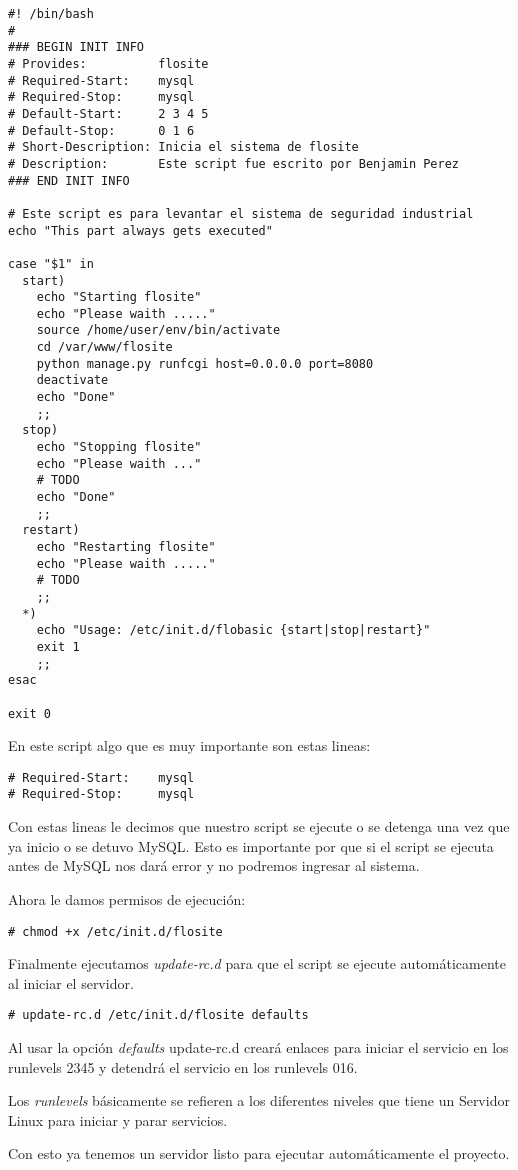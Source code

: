 \begin{verbatim}
#! /bin/bash
#
### BEGIN INIT INFO
# Provides:          flosite
# Required-Start:    mysql
# Required-Stop:     mysql
# Default-Start:     2 3 4 5
# Default-Stop:      0 1 6
# Short-Description: Inicia el sistema de flosite
# Description:       Este script fue escrito por Benjamin Perez
### END INIT INFO

# Este script es para levantar el sistema de seguridad industrial
echo "This part always gets executed"

case "$1" in
  start)
    echo "Starting flosite"
    echo "Please waith ....."
    source /home/user/env/bin/activate
    cd /var/www/flosite
    python manage.py runfcgi host=0.0.0.0 port=8080
    deactivate
    echo "Done" 
    ;;
  stop)
    echo "Stopping flosite"
    echo "Please waith ..."
    # TODO
    echo "Done"
    ;;
  restart)
    echo "Restarting flosite"
    echo "Please waith ....."
    # TODO
    ;;
  *)
    echo "Usage: /etc/init.d/flobasic {start|stop|restart}"
    exit 1
    ;;
esac

exit 0

\end{verbatim}

En este script algo que es muy importante son estas lineas:

\begin{verbatim}
# Required-Start:    mysql
# Required-Stop:     mysql
\end{verbatim}

Con estas lineas le decimos que nuestro script se ejecute o se detenga una vez
que ya inicio o se detuvo MySQL. Esto es importante por que si el script se
ejecuta antes de MySQL nos dará error y no podremos ingresar al sistema.

Ahora le damos permisos de ejecución:

\begin{verbatim}
# chmod +x /etc/init.d/flosite
\end{verbatim}

Finalmente ejecutamos {\it update-rc.d} para que el script se ejecute automáticamente
al iniciar el servidor.

\begin{verbatim}
# update-rc.d /etc/init.d/flosite defaults
\end{verbatim}

Al usar la opción {\it defaults} update-rc.d creará enlaces para iniciar el servicio
en los runlevels 2345 y detendrá el servicio en los runlevels 016.

Los {\it runlevels} básicamente se refieren a los diferentes niveles que tiene
un Servidor Linux para iniciar y parar servicios.

Con esto ya tenemos un servidor listo para ejecutar automáticamente el proyecto.

